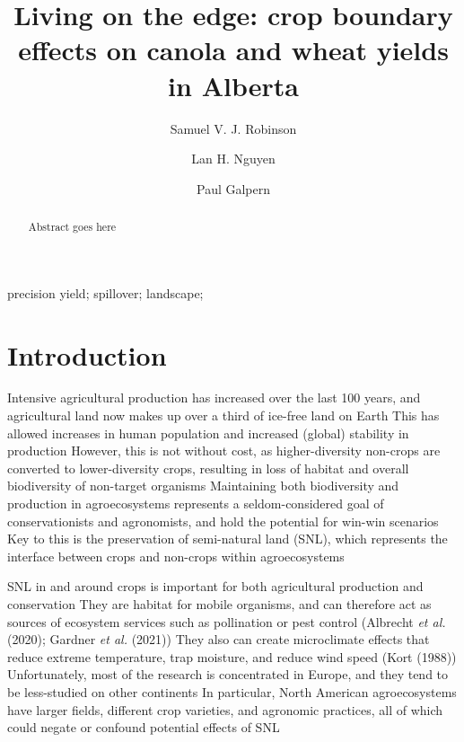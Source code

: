 \documentclass[]{elsarticle} %
\begin{document}
\begin{frontmatter}

  \title{Living on the edge: crop boundary effects on canola and wheat yields in Alberta}
    \author[University of Calgary]{Samuel V. J. Robinson}
    \author[University of Calgary]{Lan H. Nguyen}
    \author[University of Calgary]{Paul Galpern}
      \address[University of Calgary]{2500 University Drive NW, Calgary, AB}
  
  \begin{abstract}
  Abstract goes here
  \end{abstract}
   \begin{keyword} precision yield; spillover; landscape;\end{keyword}
 \end{frontmatter}

\newpage
\doublespacing

\hypertarget{introduction}{%
\section{Introduction}\label{introduction}}

Intensive agricultural production has increased over the last 100 years, and agricultural land now makes up over a third of ice-free land on Earth
This has allowed increases in human population and increased (global) stability in production
However, this is not without cost, as higher-diversity non-crops are converted to lower-diversity crops, resulting in loss of habitat and overall biodiversity of non-target organisms
Maintaining both biodiversity and production in agroecosystems represents a seldom-considered goal of conservationists and agronomists, and hold the potential for win-win scenarios
Key to this is the preservation of semi-natural land (SNL), which represents the interface between crops and non-crops within agroecosystems

SNL in and around crops is important for both agricultural production and conservation
They are habitat for mobile organisms, and can therefore act as sources of ecosystem services such as pollination or pest control (Albrecht \emph{et al.} (2020); Gardner \emph{et al.} (2021))
They also can create microclimate effects that reduce extreme temperature, trap moisture, and reduce wind speed (Kort (1988))
Unfortunately, most of the research is concentrated in Europe, and they tend to be less-studied on other continents
In particular, North American agroecosystems have larger fields, different crop varieties, and agronomic practices, all of which could negate or confound potential effects of SNL
\end{document}
